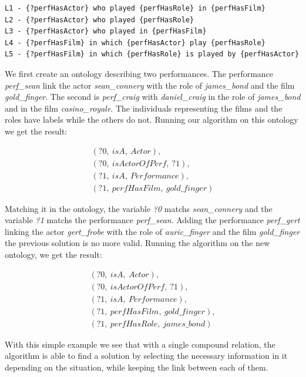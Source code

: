\begin{lstlisting}[frame=single, caption={ The set of labels usable to discribe the performance compound relation.}, label={lst:chap7_perf_labels}, captionpos=b, style=Labels, mathescape=true]
L1 - {?perfHasActor} who played {perfHasRole} in {perfHasFilm}
L2 - {?perfHasActor} who played {perfHasRole}
L3 - {?perfHasActor} who played in {perfHasFilm}
L4 - {?perfHasFilm} in which {perfHasActor} play {perfHasRole}
L5 - {?perfHasFilm} in which {perfHasRole} is played by {perfHasActor}
\end{lstlisting}

We first create an ontology describing two performances. The performance \textit{perf\_sean} link the actor \textit{sean\_connery} with the role of \textit{james\_bond} and the film \textit{gold\_finger}. The second is \textit{perf\_craig} with \textit{daniel\_craig} in the role of \textit{james\_bond} and in the film \textit{casino\_royale}. The individuals representing the films and the roles have labels while the others do not. Running our algorithm on this ontology we get the result:

\begin{gather*}
(?0,\ isA,\ Actor),\\
(?0,\ isActorOfPerf,\ ?1),\\
(?1,\ isA,\ Performance),\\
(?1,\ perfHasFilm,\ gold\_finger)
\end{gather*}

Matching it in the ontology, the variable \textit{?0} matchs \textit{sean\_connery} and the variable \textit{?1} matchs the performance \textit{perf\_sean}. Adding the performance \textit{perf\_gert} linking the actor \textit{gert\_frobe} with the role of \textit{auric\_finger} and the film \textit{gold\_finger} the previous solution is no more valid. Running the algorithm on the new ontology, we get the result:

\begin{gather*}
(?0,\ isA,\ Actor),\\
(?0,\ isActorOfPerf,\ ?1),\\
(?1,\ isA,\ Performance),\\
(?1,\ perfHasFilm,\ gold\_finger),\\
(?1,\ perfHasRole,\ james\_bond)
\end{gather*}

With this simple example we see that with a single compound relation, the algorithm is able to find a solution by selecting the necessary information in it depending on the situation, while keeping the link between each of them.

